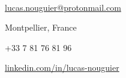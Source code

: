 \begin{TopBar}{\ColorTextSide}
  \Name{\ColorHighlight}{\myName}{\cvSubject}\\
  \vspace{0.45cm}
  \vspace{-0.35cm}
  \begin{multicols}{2}
    \begin{ItemList}{\ColorHighlight}
      \item [\Large\faAt]\href{mailto:lucas.nouguier@protonmail.com}{lucas.nouguier@protonmail.com}\vspace{0.2cm}
      \item [\Large\faHome] Montpellier, France
      \item [\Large\faPhone] +33 7 81 76 81 96\vspace{0.2cm}
      \item [\Large\faLinkedinIn] \hspace{0.1cm}\href{https://www.linkedin.com/in/lucas-nouguier/}{linkedin.com/in/lucas-nouguier}\vspace{0.2cm}
    \end{ItemList}
  \end{multicols}
\end{TopBar}